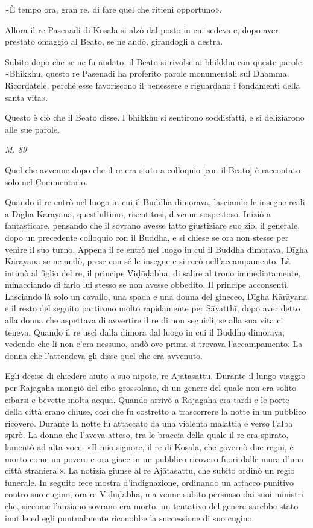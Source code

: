 «È tempo ora, gran re, di fare quel che ritieni opportuno».


Allora il re Pasenadi di Kosala si alzò dal posto in cui sedeva e, dopo
aver prestato omaggio al Beato, se ne andò, girandogli a destra.


Subito dopo che se ne fu andato, il Beato si rivolse ai bhikkhu con
queste parole: «Bhikkhu, questo re Pasenadi ha proferito parole
monumentali sul Dhamma. Ricordatele, perché esse favoriscono il
benessere e riguardano i fondamenti della santa vita».


Questo è ciò che il Beato disse. I bhikkhu si sentirono soddisfatti, e
si deliziarono alle sue parole.


\emph{M. 89}


 Quel che avvenne dopo che il re era stato a colloquio
[con il Beato] è raccontato solo nel Commentario.


 Quando il re entrò nel luogo in cui il Buddha
dimorava, lasciando le insegne reali a Dīgha Kārāyana, quest’ultimo,
risentitosi, divenne sospettoso. Iniziò a fantasticare, pensando che il
sovrano avesse fatto giustiziare suo zio, il generale, dopo un
precedente colloquio con il Buddha, e si chiese se ora non stesse per
venire il suo turno. Appena il re entrò nel luogo in cui il Buddha
dimorava, Dīgha Kārāyana se ne andò, prese con sé le insegne e si recò
nell’accampamento. Là intimò al figlio del re, il principe Viḍūḍabha, di
salire al trono immediatamente, minacciando di farlo lui stesso se non
avesse obbedito. Il principe acconsentì. Lasciando là solo un cavallo,
una spada e una donna del gineceo, Dīgha Kārāyana e il resto del seguito
partirono molto rapidamente per Sāvatthī, dopo aver detto alla donna che
aspettava di avvertire il re di non seguirli, se alla sua vita ci
teneva. Quando il re uscì dalla dimora dal luogo in cui il Buddha
dimorava, vedendo che lì non c’era nessuno, andò ove prima si trovava
l’accampamento. La donna che l’attendeva gli disse quel che era
avvenuto.


Egli decise di chiedere aiuto a suo nipote, re Ajātasattu. Durante il
lungo viaggio per Rājagaha mangiò del cibo grossolano, di un genere
del quale non era solito cibarsi e bevette molta acqua. Quando arrivò a
Rājagaha era tardi e le porte della città erano chiuse, così che fu
costretto a trascorrere la notte in un pubblico ricovero. Durante la
notte fu attaccato da una violenta malattia e verso l’alba spirò. La
donna che l’aveva atteso, tra le braccia della quale il re era spirato,
lamentò ad alta voce: «Il mio signore, il re di Kosala, che governò due
regni, è morto come un povero e ora giace in un pubblico ricovero fuori
dalle mura d’una città straniera!». La notizia giunse al re Ajātasattu,
che subito ordinò un regio funerale. In seguito fece mostra
d’indignazione, ordinando un attacco punitivo contro suo cugino, ora re
Viḍūḍabha, ma venne subito persuaso dai suoi ministri che, siccome
l’anziano sovrano era morto, un tentativo del genere sarebbe stato
inutile ed egli puntualmente riconobbe la successione di suo cugino.


